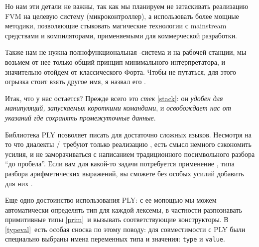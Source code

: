 Но нам эти детали не важны, так как мы планируем не затаскивать реализацию FVM
на целевую систему (микроконтроллер), а использовать более мощные методики,
позволяющие стыковать магические технологии с mainstream средствами и
компиляторами, применяемыми для коммерческой разработки.

Также нам не нужна полнофункциональная \F-система и на рабочей станции, мы
возьмем от нее только общий принцип минимального интерпретатора, и значительно
отойдем от классического Форта. Чтобы не путаться, для этого огрызка стоит взять
другое имя, я назвал его \pyf.


Итак, что у нас остается? Прежде всего это \emph{стек} \ref{stack}: он
\textit{удобен для манипуляций, запускаемых короткими командами}, и
\emph{освобождает нас от указаний где сохранять промежуточные данные}.

\medskip
{}



\label{ply}

Библиотека PLY позволяет писать  для достаточно сложных языков.
Несмотря на то что диалекты \F/\pyf\ требуют только реализацию ,
есть смысл немного сэкономить усилия, и не заморачиваться с написанием
традиционного посимвольного разбора ``до пробела''. Если вам для какой-то задачи
потребуется применение , типа разбора арифметических
выражений, вы сможете без особых усилий добавить для них .

Еще одно достоинство использования PLY: с ее мопощью мы можем автоматически
определять тип для каждой лексемы, в частности разпознавать примитивные типы
\ref{prim}\ и вызывать соответствующие конструкторы. В \ref{typeval}\ есть
особая сноска по этому поводу: для совместимости с PLY были специально выбраны
имена переменных типа и значения: \verb|type| и \verb|value|.



\secup
